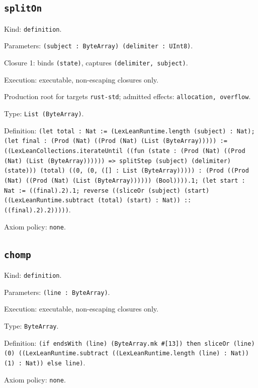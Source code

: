 \documentclass[11pt]{article}
\begin{document}
\subsection*{\texttt{splitOn}}
\noindent Kind: \texttt{definition}.\par
\noindent Parameters: \texttt{(subject : ByteArray) (delimiter : UInt8)}.\par
\noindent Closure 1: binds \texttt{(state)}, captures \texttt{(delimiter, subject)}.\par
\noindent Execution: executable, non-escaping closures only.\par
\noindent Production root for targets \texttt{rust-std}; admitted effects: \texttt{allocation, overflow}.\par
\noindent Type: \texttt{List (ByteArray)}.\par
\noindent Definition: \texttt{(let total : Nat := (LexLeanRuntime.length (subject) : Nat); (let final : (Prod (Nat) ((Prod (Nat) (List (ByteArray))))) := ((LexLeanCollections.iterateUntil ((fun (state : (Prod (Nat) ((Prod (Nat) (List (ByteArray)))))) => splitStep (subject) (delimiter) (state))) (total) ((0, (0, ([] : List (ByteArray))))) : (Prod ((Prod (Nat) ((Prod (Nat) (List (ByteArray)))))) (Bool)))).1; (let start : Nat := ((final).2).1; reverse ((sliceOr (subject) (start) ((LexLeanRuntime.subtract (total) (start) : Nat)) :: ((final).2).2)))))}.\par
\noindent Axiom policy: \texttt{none}.\par
\subsection*{\texttt{chomp}}
\noindent Kind: \texttt{definition}.\par
\noindent Parameters: \texttt{(line : ByteArray)}.\par
\noindent Execution: executable, non-escaping closures only.\par
\noindent Type: \texttt{ByteArray}.\par
\noindent Definition: \texttt{(if endsWith (line) (ByteArray.mk \#[13]) then sliceOr (line) (0) ((LexLeanRuntime.subtract ((LexLeanRuntime.length (line) : Nat)) (1) : Nat)) else line)}.\par
\noindent Axiom policy: \texttt{none}.\par
\end{document}
